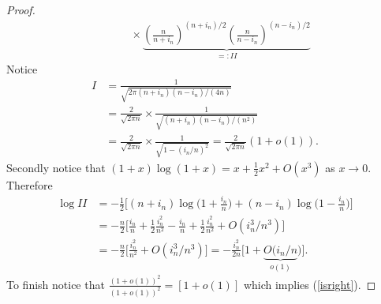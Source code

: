 \begin{proof}
\begin{align*}
&\qquad\times\underbrace{\left(\frac{n}{n+i_n}\right)^{(n+i_n)/2}\left(\frac{n}{n-i_n}\right)^{(n-i_n)/2}}_{=:I\!I}
\end{align*}
Notice
\begin{align*}
I&=\frac{1 }{\sqrt{2\pi (n+i_n) (n-i_n)/(4n)}  }\\
 &= \frac{2}{\sqrt{2\pi n}}\times \frac{1}{\sqrt{ (n+i_n) (n-i_n)/(n^2)}}\\
&= \frac{2}{\sqrt{2\pi n}}\times \frac{1}{\sqrt{1   -(i_n/n)^2}}= \frac{2}{\sqrt{2\pi n}} (1+o(1)).
\end{align*}
Secondly notice that $(1+x)\log(1+x)= x +\frac{1}{2}x^2+O(x^3)$ as $x\rightarrow 0$. Therefore
\begin{align*}
\log I\!I&= -\frac{1}{2}\bigl[ (n+i_n)\log \bigl(1+\frac{i_n}{n}\bigr) +  (n-i_n)\log \bigl(1-\frac{i_n}{n}\bigr) \bigr] \\
&=-\frac{n}{2}\bigl[\frac{i_n}{n} +\frac{1}{2}\frac{i_n^2}{n^2} - \frac{i_n}{n} +\frac{1}{2}\frac{i_n^2}{n^2}+O({i^3_n}/{n}^3)  \bigr] \\
&=-\frac{n}{2}\bigl[  \frac{i_n^2}{n^2}  +O({i^3_n}/{n}^3)  \bigr] = -\frac{i_n^2}{2n}\bigl[ 1  +\underbrace{O({i_n}/{n}}_{o(1)})  \bigr].
\end{align*}
To finish notice that   $\frac{(1+o(1))^2}{(1+o(1))^2} = [1+o(1)]$ which implies (\ref{isright}).



\end{proof}
